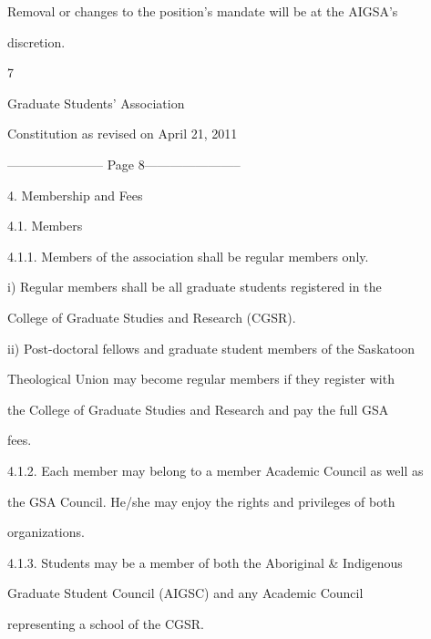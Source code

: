 Removal  or  changes  to  the  position’s  mandate  will  be  at  the  AIGSA’s  

discretion.  



                                                

                                              7  



                               Graduate Students’ Association  



                          Constitution as revised on April 21, 2011  


----------------------- Page 8-----------------------

4.  Membership and Fees  



4.1.        Members  



4.1.1. Members of the association shall be regular members only.  



i)      Regular  members  shall  be  all  graduate  students  registered  in  the  

        College of Graduate Studies and Research (CGSR).  



ii)     Post-doctoral fellows and graduate student members of the Saskatoon  

        Theological Union may become regular members if they register with  

        the College of Graduate  Studies  and  Research and  pay  the  full  GSA  

        fees.  



4.1.2. Each member may belong to a member Academic Council as well as  

        the GSA Council. He/she may enjoy the rights and privileges of both  

        organizations.  



4.1.3.  Students  may  be  a  member  of  both  the  Aboriginal  &  Indigenous  

        Graduate   Student   Council   (AIGSC)   and   any   Academic   Council  

        representing a school of the CGSR.  



